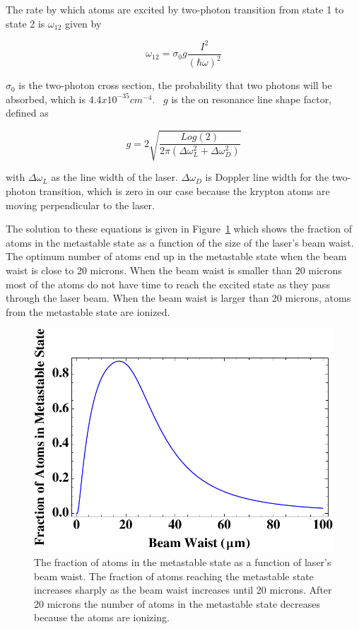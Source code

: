 \documentclass[prb,preprint]{revtex4-1}
\begin{document}
The rate by which atoms are excited by two-photon transition from state 1 to state 2 is $\omega_{12}$ given by

\begin{equation}
\label{ExcitationRate}
\omega_{12} = \sigma_0 g \frac{I^2}{(\hbar \omega)^2}
\end{equation}

$\sigma_0$ is the two-photon cross section, the probability that two photons will be absorbed, which is $4.4x10^{-35} cm^{-4}$.~\cite{NIST} $g$ is the on resonance line shape factor, defined as 

\begin{equation}
\label{LineShapeFactor}
g = 2 \sqrt{\frac{Log(2)}{2 \pi (\Delta \omega_L^2 + \Delta \omega_D^2)}}
\end{equation}

with $\Delta\omega_L$ as the line width of the laser. $\Delta \omega_D$ is Doppler line width for the two-photon transition, which is zero in our case because the krypton atoms are moving perpendicular to the laser.

The solution to these equations is given in Figure~\ref{MetaGraph1} which shows the fraction of atoms in the metastable state as a function of the size of the laser's beam waist. The optimum number of atoms end up in the metastable state when the beam waist is close to 20 microns. When the beam waist is smaller than 20 microns most of the atoms do not have time to reach the excited state as they pass through the laser beam. When the beam waist is larger than 20 microns, atoms from the metastable state are ionized.

\begin{figure}[h!]
\centering
\includegraphics[width=6in]{MetaGraph1.pdf}
\caption{The fraction of atoms in the metastable state as a function of laser's beam waist. The fraction of atoms reaching the metastable state increases sharply as the beam waist increases until 20 microns. After 20 microns the number of atoms in the metastable state decreases because the atoms are ionizing.}
\label{MetaGraph1}
\end{figure}
\end{document}
